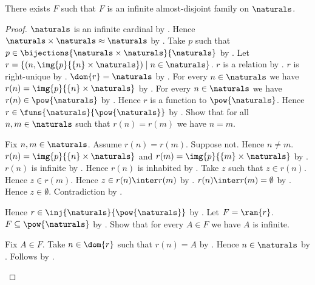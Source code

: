 \begin{theorem}\label{infinite_almost_disjoint_family_on_naturals_exists}
    There exists $F$ such that
        $F$ is an infinite almost-disjoint family on $\naturals$.
\end{theorem}
\begin{proof}
    $\naturals$ is an infinite cardinal
        by .
    Hence $\naturals\times\naturals\approx\naturals$
        by .
    Take $p$ such that
        $p\in\bijections{\naturals\times\naturals}{\naturals}$
        by .
    Let $r=\{(n,\img{p}{\{n\}\times\naturals})
        \mid n\in\naturals\}$.
    $r$ is a relation by .
    $r$ is right-unique by .
    $\dom{r}=\naturals$ by .
    For every $n\in\naturals$ we have
        $r(n)=\img{p}{\{n\}\times\naturals}$
        by .
    For every $n\in\naturals$ we have $r(n)\in\pow{\naturals}$
        by .
    Hence $r$ is a function to $\pow{\naturals}$.
    Hence $r\in\funs{\naturals}{\pow{\naturals}}$
        by .
    Show that for all $n,m\in\naturals$ such that $r(n)=r(m)$
        we have $n=m$.
    \begin{subproof}
        Fix $n,m\in\naturals$.
        Assume $r(n)=r(m)$.
        Suppose not.
        Hence $n\neq m$.
        $r(n)=\img{p}{\{n\}\times\naturals}$ and
            $r(m)=\img{p}{\{m\}\times\naturals}$
            by .
        $r(n)$ is infinite by .
        Hence $r(n)$ is inhabited by
            .
        Take $z$ such that $z\in r(n)$.
        Hence $z\in r(m)$.
        Hence $z\in r(n)\inter r(m)$ by .
        $r(n)\inter r(m)=\emptyset$
            by .
        Hence $z\in\emptyset$.
        Contradiction by .
    \end{subproof}
    Hence $r\in\inj{\naturals}{\pow{\naturals}}$ by .
    Let $F=\ran{r}$.
    $F\subseteq\pow{\naturals}$ by .
    Show that for every $A\in F$ we have $A$ is infinite.
    \begin{subproof}
        Fix $A\in F$.
        Take $n\in\dom{r}$ such that $r(n)=A$ by .
        Hence $n\in\naturals$ by .
        Follows by .
    \end{subproof}

\end{proof}
